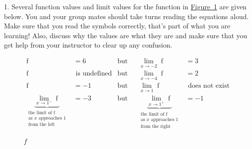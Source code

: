 \documentclass[12pt,]{book}
\theoremstyle{plain}
\theoremstyle{definition}
\numberwithin{equation}{section}
\providecommand\phantomsection{}
\newcommand{\fe}[2]{\mathop{{#1}{\left(#2\right)}}}
\begin{document}
\begin{exerciselist}
\item[1.]\phantomsection\hypertarget{exercise-30}{\null}Several function values and limit values for the function in \hyperref[figure-first-limit]{Figure~\ref*{figure-first-limit}} are given below. You and your group mates should take turns reading the equations aloud. Make sure that you read the symbols correctly, that's part of what you are learning! Also, discuss why the values are what they are and make sure that you get help from your instructor to clear up any confusion.%
\par
\begin{align*}
\fe{f}{-2}&=6&\text{but}&&\lim_{x\to-2}\fe{f}{x}&=3\\
\fe{f}{-4}&\text{ is undefined}&\text{but}&&\lim_{x\to-4}\fe{f}{x}&=2\\
\fe{f}{1}&=-1&\text{but}&&\lim_{x\to1}\fe{f}{x}&\text{ does not exist}\\
\underbrace{\lim_{x\to1^{-}}\fe{f}{x}}_{\begin{array}{c}\text{the limit of }\fe{f}{x}\\\text{as }x\text{ approaches }1\\\text{from the left}\end{array}}&=-3&\text{but}&&\underbrace{\lim_{x\to1^{+}}\fe{f}{x}}_{\begin{array}{c}\text{the limit of }\fe{f}{x}\\\text{as }x\text{ approaches }1\\\text{from the right}\end{array}}&=-1
\end{align*}%
\begin{figure}
\centering
{
}
\caption{\(f\)\label{figure-first-limit}}
\end{figure}
\par\smallskip
\end{exerciselist}
\end{document}
